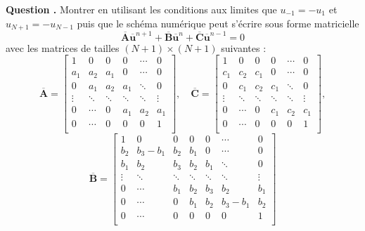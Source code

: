 \documentclass[a4,12pt]{article}
\newcommand{\A}{\mathbf{A}}
\newcommand{\B}{\mathbf{B}}
\newcommand{\C}{\mathbf{C}}
\newcommand{\ub}{\mathbf{u}}
\newcounter{Nbquestion}
\newcommand*\question{%
\stepcounter{Nbquestion}%
\textbf{Question \theNbquestion. }}
\begin{document}
\begin{mdframed}[style=exampledefault]

\question Montrer en utilisant les conditions aux limites que $u_{-1}=-u_1$ et $u_{N+1}=-u_{N-1}$ puis que le schéma numérique peut s'écrire sous forme matricielle 
\begin{equation}
	\overline{\A} \overline{\ub}^{n+1}+\overline{\B} \overline{\ub}^n+\overline{\C} \overline{\ub}^{n-1}=0
\end{equation} 
avec les matrices de tailles $(N+1)\times (N+1)$ suivantes : 
\[
\overline{\A}=
\begin{bmatrix}
1 & 0 & 0 & 0 & \cdots & 0 \\ 
a_1 & a_2 & a_1 & 0 & \cdots & 0 \\ 
0 & a_1 & a_2 & a_1 & \ddots & 0 \\
\vdots & \ddots & \ddots & \ddots & \ddots & \vdots \\ 
0 & \cdots & 0 & a_1 & a_2 & a_1\\ 
0 & \cdots & 0 & 0 & 0 & 1 \\
\end{bmatrix},\quad 
\overline{\C}=
\begin{bmatrix}
1 & 0 & 0 & 0 & \cdots & 0 \\ 
c_1 & c_2 & c_1 & 0 & \cdots & 0 \\
0 & c_1 & c_2 & c_1 & \ddots & 0 \\ 
\vdots & \ddots & \ddots & \ddots & \ddots & \vdots \\
0 & \cdots & 0 & c_1 & c_2 & c_1 \\
0 & \cdots & 0 & 0 & 0 & 1 \\
\end{bmatrix},
\]
\[ 
\overline{\B}=
\begin{bmatrix}
1 & 0 & 0 & 0 & 0  & \cdots & 0 \\ 
b_2 & b_3-b_1 & b_2 & b_1 & 0 & \cdots & 0 \\ 
b_1 & b_2 & b_3 & b_2 & b_1 & \ddots & 0 \\
\vdots & \ddots & \ddots & \ddots & \ddots & \ddots & \vdots \\ 
0 & \cdots & b_1 & b_2 & b_3 & b_2 & b_1 \\ 
0 & \cdots &  0 & b_1 & b_2 & b_3-b_1 & b_2 \\ 
0 & \cdots & 0 & 0 &  0 & 0 & 1 \\
\end{bmatrix}
\]
\end{mdframed}

\end{document}
